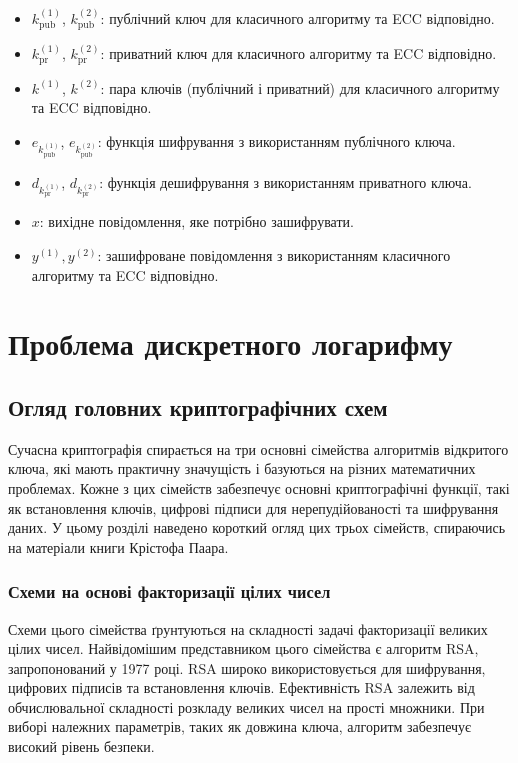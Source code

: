 \documentclass[12pt]{report}
\theoremstyle{definition}
\theoremstyle{plain}
\begin{document}
\begin{itemize}
    \item $k_{\text{pub}}^{(1)}$, $k_{\text{pub}}^{(2)}$: публічний ключ для класичного алгоритму та ECC відповідно.
    \item $k_{\text{pr}}^{(1)}$, $k_{\text{pr}}^{(2)}$: приватний ключ для класичного алгоритму та ECC відповідно.
    \item $k^{(1)}$, $k^{(2)}$: пара ключів (публічний і приватний) для класичного алгоритму та ECC відповідно.
    \item $e_{k_{\text{pub}}^{(1)}}$, $e_{k_{\text{pub}}^{(2)}}$: функція шифрування з використанням публічного ключа.
    \item $d_{k_{\text{pr}}^{(1)}}$, $d_{k_{\text{pr}}^{(2)}}$: функція дешифрування з використанням приватного ключа.
    \item $x$: вихідне повідомлення, яке потрібно зашифрувати.
    \item $y^{(1)}, y^{(2)}$: зашифроване повідомлення з використанням класичного алгоритму та ECC відповідно.
\end{itemize}

\chapter{Проблема дискретного логарифму}

\section{Огляд головних криптографічних схем}

Сучасна криптографія спирається на три основні сімейства алгоритмів відкритого ключа, які мають практичну значущість і базуються на різних математичних проблемах. Кожне з цих сімейств забезпечує основні криптографічні функції, такі як встановлення ключів, цифрові підписи для нерепудійованості та шифрування даних. У цьому розділі наведено короткий огляд цих трьох сімейств, спираючись на матеріали книги Крістофа Паара.

\subsection{Схеми на основі факторизації цілих чисел}

Схеми цього сімейства ґрунтуються на складності задачі факторизації великих цілих чисел. Найвідомішим представником цього сімейства є алгоритм RSA, запропонований у 1977 році. RSA широко використовується для шифрування, цифрових підписів та встановлення ключів. Ефективність RSA залежить від обчислювальної складності розкладу великих чисел на прості множники. При виборі належних параметрів, таких як довжина ключа, алгоритм забезпечує високий рівень безпеки.
\end{document}
